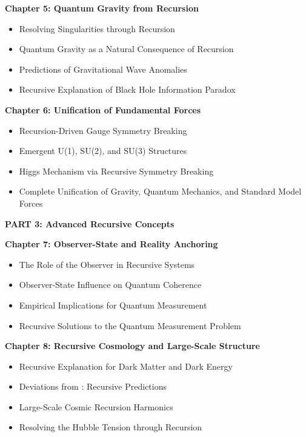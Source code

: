 \documentclass[
]{article}
\begin{document}
\textbf{Chapter 5: Quantum Gravity from Recursion}

\begin{itemize}
\item
  Resolving Singularities through Recursion
\item
  Quantum Gravity as a Natural Consequence of Recursion
\item
  Predictions of Gravitational Wave Anomalies
\item
  Recursive Explanation of Black Hole Information Paradox
\end{itemize}

\textbf{Chapter 6: Unification of Fundamental Forces}

\begin{itemize}
\item
  Recursion-Driven Gauge Symmetry Breaking
\item
  Emergent U(1), SU(2), and SU(3) Structures
\item
  Higgs Mechanism via Recursive Symmetry Breaking
\item
  Complete Unification of Gravity, Quantum Mechanics, and Standard Model
  Forces
\end{itemize}

\textbf{PART 3: Advanced Recursive Concepts}

\textbf{Chapter 7: Observer-State and Reality Anchoring}

\begin{itemize}
\item
  The Role of the Observer in Recursive Systems
\item
  Observer-State Influence on Quantum Coherence
\item
  Empirical Implications for Quantum Measurement
\item
  Recursive Solutions to the Quantum Measurement Problem
\end{itemize}

\textbf{Chapter 8: Recursive Cosmology and Large-Scale Structure}

\begin{itemize}
\item
  Recursive Explanation for Dark Matter and Dark Energy
\item
  Deviations from \LambdaCDM: Recursive Predictions
\item
  Large-Scale Cosmic Recursion Harmonics
\item
  Resolving the Hubble Tension through Recursion
\end{itemize}
\end{document}

